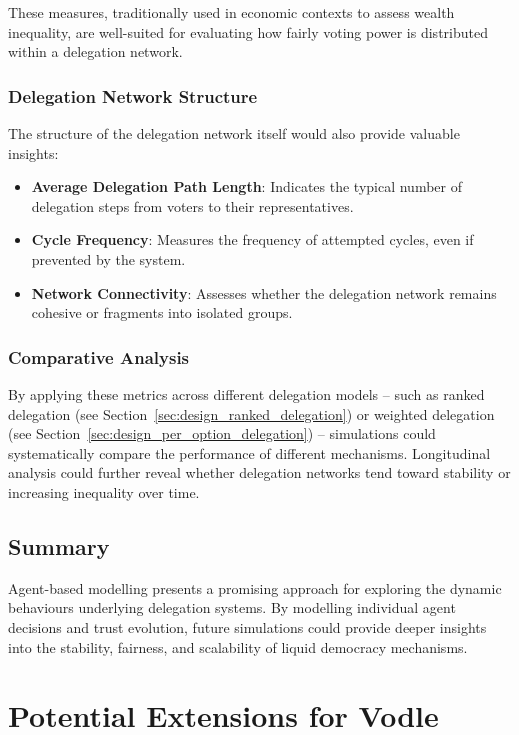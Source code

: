 These measures, traditionally used in economic contexts to assess wealth inequality, are well-suited for evaluating how fairly voting power is distributed within a delegation network.

\subsubsection{Delegation Network Structure}

The structure of the delegation network itself would also provide valuable insights:

\begin{itemize}
    \item \textbf{Average Delegation Path Length}: Indicates the typical number of delegation steps from voters to their representatives.
    \item \textbf{Cycle Frequency}: Measures the frequency of attempted cycles, even if prevented by the system.
    \item \textbf{Network Connectivity}: Assesses whether the delegation network remains cohesive or fragments into isolated groups.
\end{itemize}

\subsubsection{Comparative Analysis}

By applying these metrics across different delegation models -- such as ranked delegation (see Section~\ref{sec:design_ranked_delegation}) or weighted delegation (see Section~\ref{sec:design_per_option_delegation}) -- simulations could systematically compare the performance of different mechanisms. Longitudinal analysis could further reveal whether delegation networks tend toward stability or increasing inequality over time.

\subsection{Summary}

Agent-based modelling presents a promising approach for exploring the dynamic behaviours underlying delegation systems. By modelling individual agent decisions and trust evolution, future simulations could provide deeper insights into the stability, fairness, and scalability of liquid democracy mechanisms.


\section{Potential Extensions for Vodle}

